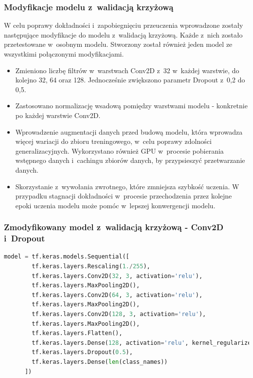 \subsubsection{Modyfikacje modelu z~walidacją krzyżową}

W celu poprawy dokładności i~zapobiegnięciu przeuczenia wprowadzone
zostały następujące modyfikacje do modelu z~walidacją krzyżową.
Każde z~nich zostało przetestowane w~osobnym modelu.
Stworzony został również jeden model ze wszystkimi połączonymi modyfikacjami. 
\begin{itemize}[label=-,labelsep=0.4cm,leftmargin=0.6cm]
    \item Zmieniono liczbę filtrów w~warstwach Conv2D z~32 w~każdej warstwie, do kolejno 32, 64 oraz 128.
		Jednocześnie zwiększono parametr Dropout z~0,2 do 0,5.
    \item Zastosowano normalizację wsadową pomiędzy warstwami modelu - konkretnie po każdej warstwie Conv2D.
    \item Wprowadzenie augmentacji danych przed budową modelu, która wprowadza więcej wariacji do zbioru treningowego,
		w~celu poprawy zdolności generalizacyjnych.
		Wykorzystano również GPU w~procesie pobierania wstępnego danych i~cachingu zbiorów danych, by przypsieszyć przetwarzanie danych.
	\item Skorzystanie z~wywołania zwrotnego, które zmniejsza szybkość uczenia.
		W przypadku stagnacji dokładności w~procesie przechodzenia przez kolejne epoki uczenia modelu
		może pomóc w~lepszej konwergencji modelu.
\end{itemize}

\subsubsection{Zmodyfikowany model z~walidacją krzyżową - Conv2D i~Dropout}

\begin{lstlisting}[language=Python,caption=Listing zmodyfikowanego skryptu tworzącego model z~walidacją krzyżową - wersja 1,
	label={tests-model-crossval1}]
	model = tf.keras.models.Sequential([
		tf.keras.layers.Rescaling(1./255),
		tf.keras.layers.Conv2D(32, 3, activation='relu'),
		tf.keras.layers.MaxPooling2D(),
		tf.keras.layers.Conv2D(64, 3, activation='relu'),
		tf.keras.layers.MaxPooling2D(),
		tf.keras.layers.Conv2D(128, 3, activation='relu'),
		tf.keras.layers.MaxPooling2D(),
		tf.keras.layers.Flatten(),
		tf.keras.layers.Dense(128, activation='relu', kernel_regularizer=tf.keras.regularizers.l2(0.01)),
		tf.keras.layers.Dropout(0.5),
		tf.keras.layers.Dense(len(class_names))
	  ])
\end{lstlisting}

